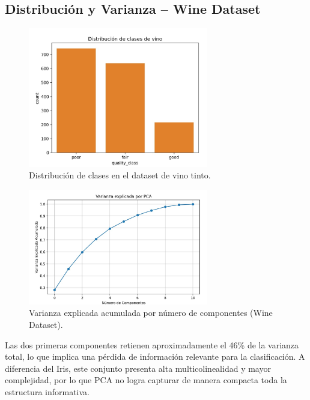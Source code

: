 \documentclass[12pt]{article}
\begin{document}
\subsection{Distribución y Varianza – Wine Dataset}
\begin{figure}[H]
\centering
\includegraphics[width=0.7\textwidth]{figures/wine_class_distribution.png}
\caption{Distribución de clases en el dataset de vino tinto.}
\end{figure}

\begin{figure}[H]
\centering
\includegraphics[width=0.7\textwidth]{figures/wine_explained_variance.png}
\caption{Varianza explicada acumulada por número de componentes (Wine Dataset).}
\end{figure}

Las dos primeras componentes retienen aproximadamente el 46\% de la varianza total, lo que implica una pérdida de información relevante para la clasificación. A diferencia del Iris, este conjunto presenta alta multicolinealidad y mayor complejidad, por lo que PCA no logra capturar de manera compacta toda la estructura informativa.
\end{document}
